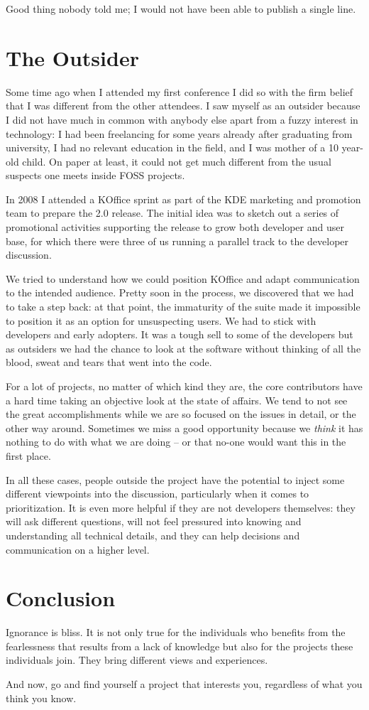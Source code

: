 Good thing nobody told me; I would not have been able to publish a single line.

\section*{The Outsider}

Some time ago when I attended my first conference I did so with the firm belief
that I was different from the other attendees. I saw myself as an outsider
because I did not have much in common with anybody else apart from a fuzzy
interest in technology: I had been freelancing for some years already after
graduating from university, I had no relevant education in the field, and I was
mother of a 10 year-old child. On paper at least, it could not get much
different from the usual suspects one meets inside FOSS projects.

In 2008 I attended a KOffice sprint as part of the KDE marketing and promotion
team to prepare the 2.0 release. The initial idea was to sketch out a series of
promotional activities supporting the release to grow both developer and user
base, for which there were three of us running a parallel track to the developer
discussion.

We tried to understand how we could position KOffice and adapt communication to
the intended audience. Pretty soon in the process, we discovered that we had to
take a step back: at that point, the immaturity of the suite made it impossible
to position it as an option for unsuspecting users. We had to stick with
developers and early adopters. It was a tough sell to some of the developers but
as outsiders we had the chance to look at the software without thinking of all
the blood, sweat and tears that went into the code.

For a lot of projects, no matter of which kind they are, the core contributors
have a hard time taking an objective look at the state of affairs. We tend to
not see the great accomplishments while we are so focused on the issues in
detail, or the other way around. Sometimes we miss a good opportunity because we
\textit{think} it has nothing to do with what we are doing -- or that no-one
would want this in the first place.

In all these cases, people outside the project have the potential to inject some
different viewpoints into the discussion, particularly when it comes to
prioritization. It is even more helpful if they are not developers themselves:
they will ask different questions, will not feel pressured into knowing and
understanding all technical details, and they can help decisions and
communication on a higher level.

\section*{Conclusion}

Ignorance is bliss. It is not only true for the individuals who benefits from
the fearlessness that results from a lack of knowledge but also for the projects
these individuals join. They bring different views and experiences.

And now, go and find yourself a project that interests you, regardless of what
you think you know.
